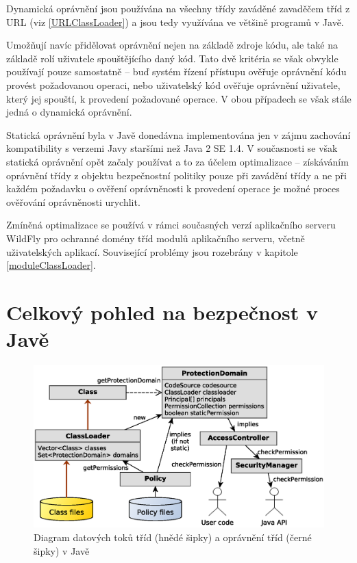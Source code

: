 Dynamická oprávnění jsou používána na všechny třídy zaváděné zavaděčem tříd z URL (viz \ref{URLClassLoader}) a jsou tedy využívána ve většině programů v Javě.
\cite{sourceURLClassLoader}

Umožňují navíc přidělovat oprávnění nejen na základě zdroje kódu, ale také na základě rolí uživatele spouštějícího daný kód. Tato dvě kritéria se však
obvykle používají pouze samostatně -- buď systém řízení přístupu ověřuje oprávnění kódu provést požadovanou operaci, nebo uživatelský kód ověřuje oprávnění
uživatele, který jej spouští, k provedení požadované operace. V obou případech se však stále jedná o dynamická oprávnění.

Statická oprávnění byla v Javě donedávna implementována jen v zájmu zachování kompatibility s verzemi Javy staršími než Java 2 SE 1.4. \cite{sourceProtectionDomain}
V současnosti se však statická oprávnění opět začaly používat a to za účelem optimalizace -- získáváním oprávnění třídy z objektu bezpečnostní politiky
pouze při zavádění třídy a ne při každém požadavku o ověření oprávněnosti k provedení operace je možné proces ověřování oprávněnosti urychlit.

Zmíněná optimalizace se používá v rámci současných verzí aplikačního serveru WildFly pro ochranné domény tříd modulů aplikačního serveru, včetně uživatelských aplikací. Související problémy jsou rozebrány v kapitole \ref{moduleClassLoader}.

\section{Celkový pohled na bezpečnost v Javě}

\begin{figure}[ht]
  \centering
  \includegraphics[width=14cm]{fig/domain-schema}
  \caption{Diagram datových toků tříd (hnědé šipky) a oprávnění tříd (černé šipky) v Javě}
  \label{diagramDatovychToku}
\end{figure}

